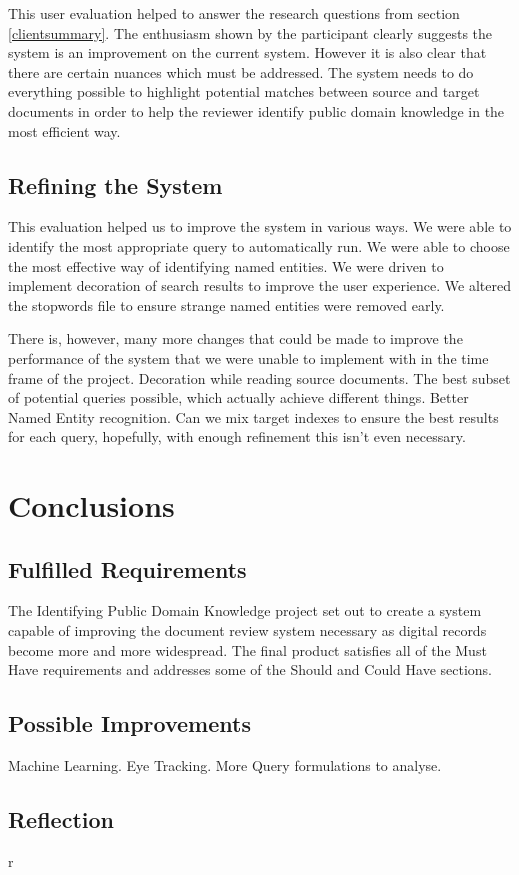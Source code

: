 \documentclass{l4proj}
\begin{document}
This user evaluation helped to answer the research questions from section \ref{clientsummary}. The enthusiasm shown by the participant clearly suggests the system is an improvement on the current system. However it is also clear that there are certain nuances which must be addressed.
The system needs to do everything possible to highlight potential matches between source and target documents in order to help the reviewer identify public domain knowledge in the most efficient way.

\section{Refining the System}
This evaluation helped us to improve the system in various ways.
We were able to identify the most appropriate query to automatically run. We were able to choose the most effective way of identifying named entities.
We were driven to implement decoration of search results to improve the user experience.
We altered the stopwords file to ensure strange named entities were removed early.

There is, however, many more changes that could be made to improve the performance of the system that we were unable to implement with in the time frame of the project.
Decoration while reading source documents. The best subset of potential queries possible, which actually achieve different things.
Better Named Entity recognition.
Can we mix target indexes to ensure the best results for each query, hopefully, with enough refinement this isn't even necessary.

\chapter{Conclusions} \label{conclusion}
\section{Fulfilled Requirements}
The Identifying Public Domain Knowledge project set out to create a system capable of improving the document review system necessary as digital records become more and more widespread.
The final product satisfies all of the Must Have requirements and addresses some of the Should and Could Have sections. 
\section{Possible Improvements}
Machine Learning. Eye Tracking. More Query formulations to analyse.

\section{Reflection}

\begin{appendices}  r

\end{appendices}




\end{document}
